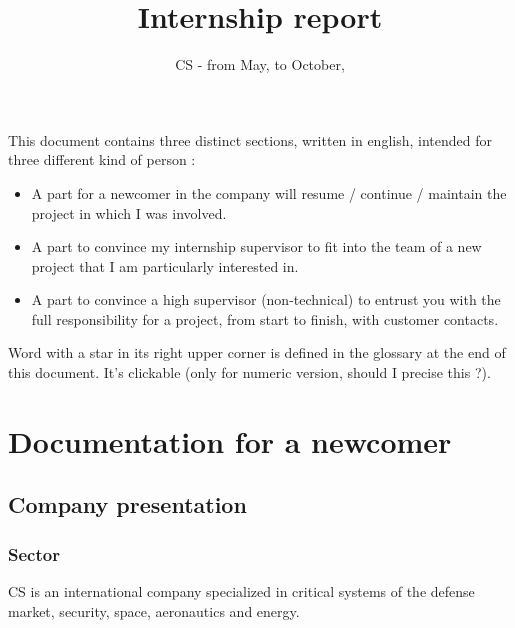 \documentclass{koala-en}
\begin{document}
\title{Internship report}
\subtitle{CS - from  May,  to October, }


\summary
{
  This document contains three distinct sections, written in english, intended for three different kind of person :
  \begin{itemize}
     \item A part for a newcomer in the company will resume / continue / maintain the project in which I was involved.
     \item A part to convince my internship supervisor to fit into the team of a new project that I am particularly interested in.
     \item A part to convince a high supervisor (non-technical) to entrust you with the full responsibility for a project, from start to finish, with customer contacts.
  \end{itemize}
  Word with a star in its right upper corner is defined in the glossary at the end of this document. It's clickable (only for numeric version, should I precise this ?).
}

\maketitle

\newpage
\thispagestyle{empty}

\tableofcontents

\thispagestyle{fancy}
\newpage

\part{Documentation for a newcomer}
\chapter{Company presentation}
\section{Sector}
CS is an international company specialized in critical systems of the defense market, security, space, aeronautics and energy.
\end{document}
